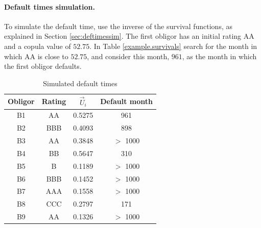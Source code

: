 \documentclass[a4paper,12pt,final]{article}
\begin{document}
\paragraph{Default times simulation.} To simulate the default time, use the 
inverse of the survival functions, as explained in Section \ref{sec:deftimessim}.
The first obligor has an initial rating AA and a copula value of $52.75$. 
In Table \ref{example.survivals} search for the month in which AA is close to 
$52.75$, and consider this month, $961$, as the month in which the first obligor 
defaults. 
{\small
\begin{table}[!hbt]
\begin{center}
\begin{tabular}[]{|c|c|c|c|}
Obligor  & Rating & $\vec{U}_i$ & Default month \\
\hline
B1       & AA     &  0.5275     &  961      \\
B2       & BBB    &  0.4093     &  898      \\
B3       & AA     &  0.3848     &  $>$ 1000 \\
B4       & BB     &  0.5647     &  310      \\
B5       & B      &  0.1189     &  $>$ 1000 \\
B6       & BBB    &  0.1452     &  $>$ 1000 \\
B7       & AAA    &  0.1558     &  $>$ 1000 \\
B8       & CCC    &  0.2797     &  171      \\
B9       & AA     &  0.1326     &  $>$ 1000 \\
\end{tabular}
\caption{Simulated default times}
\end{center}
\end{table}
}
\FloatBarrier
\end{document}
